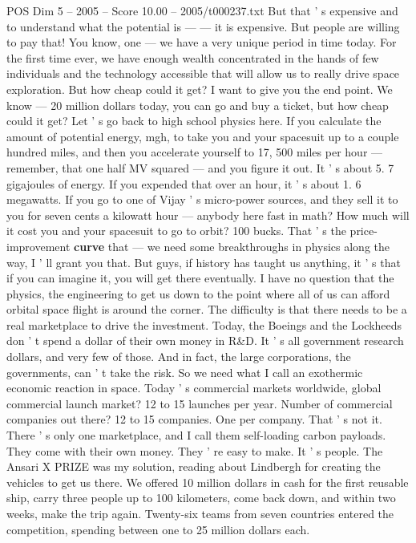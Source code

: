 \begin{textsample}{POS Dim 5 – 2005 – Score 10.00 – 2005/t000237.txt}
But that ' s expensive and to understand what the potential is — — it is expensive.
But people are willing to pay that!
You know, one — we have a very unique period in time today.
For the first time ever, we have enough wealth concentrated in the hands of few individuals and the technology accessible that will allow us to really drive space exploration.
But how cheap could it get?
I want to give you the end point.
We know — 20 million dollars today, you can go and buy a ticket, but how cheap could it get?
Let ' s go back to high school physics here.
If you calculate the amount of potential energy, mgh, to take you and your spacesuit up to a couple hundred miles, and then you accelerate yourself to 17, 500 miles per hour — remember, that one half MV squared — and you figure it out.
It ' s about 5. 7 gigajoules of energy.
If you expended that over an hour, it ' s about 1. 6 megawatts.
If you go to one of Vijay ' s micro-power sources, and they sell it to you for seven cents a kilowatt hour — anybody here fast in math?
How much will it cost you and your spacesuit to go to orbit? 100 bucks.
That ' s the price-improvement \textbf{curve} that — we need some breakthroughs in physics along the way, I ' ll grant you that.
But guys, if history has taught us anything, it ' s that if you can imagine it, you will get there eventually.
I have no question that the physics, the engineering to get us down to the point where all of us can afford orbital space flight is around the corner.
The difficulty is that there needs to be a real marketplace to drive the investment.
Today, the Boeings and the Lockheeds don ' t spend a dollar of their own money in R\&D.
It ' s all government research dollars, and very few of those.
And in fact, the large corporations, the governments, can ' t take the risk.
So we need what I call an exothermic economic reaction in space.
Today ' s commercial markets worldwide, global commercial launch market? 12 to 15 launches per year.
Number of commercial companies out there? 12 to 15 companies.
One per company.
That ' s not it.
There ' s only one marketplace, and I call them self-loading carbon payloads.
They come with their own money.
They ' re easy to make.
It ' s people.
The Ansari X PRIZE was my solution, reading about Lindbergh for creating the vehicles to get us there.
We offered 10 million dollars in cash for the first reusable ship, carry three people up to 100 kilometers, come back down, and within two weeks, make the trip again.
Twenty-six teams from seven countries entered the competition, spending between one to 25 million dollars each.

\end{textsample}
